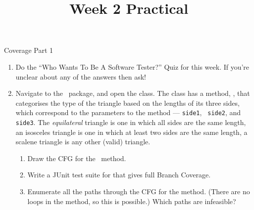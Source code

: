 



\title{Week 2 Practical}{Coverage Part 1}

\begin{enumerate}

    \item Do the ``Who Wants To Be A Software Tester?'' Quiz for this week.
    If you're unclear about any of the answers then ask!

    \item Navigate to the \lecturespackage~package, and open the
    \triangleclass class. The class has a method, \classifymethod, that
    categorises the type of the triangle based on the lengths of its three sides,
    which correspond to the parameters to the method --- {\tt side1}, {\tt
    side2}, and {\tt side3}. The {\it equilateral} triangle is one in which all sides
    are the same length, an isosceles triangle is one in which at least two
    sides are the same length, a scalene triangle is any other (valid) triangle. 

        \begin{enumerate}

            \item Draw the CFG for the \classifymethod~method.
            
            \item Write a JUnit test suite for \triangleclass that gives 
            full Branch Coverage. 
            
            \item Enumerate all the paths through the CFG for the method. (There
            are no loops in the method, so this is possible.) Which paths are
            infeasible?
            
        \end{enumerate}
        
\end{enumerate}

